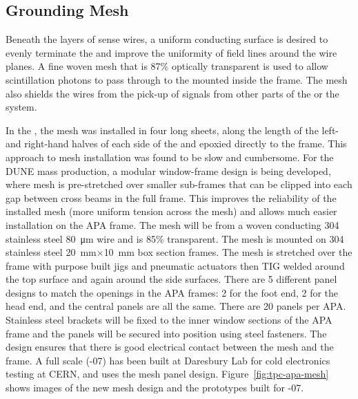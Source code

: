 
\subsection{Grounding Mesh}
\label{sec:fdsp-apa-mesh}

Beneath the layers of sense wires, a uniform conducting surface is desired to evenly terminate the \efield and improve the uniformity of field lines around the wire planes. A fine woven mesh that is \num{87}\% optically transparent is used to allow scintillation photons to pass through to the  mounted inside the frame.  The mesh also shields the  wires from the pick-up of signals from other parts of the  or the  system.  

In the  , the mesh was installed in four long sheets, along the length of the left- and right-hand halves of each side of the  and epoxied directly to the frame. This approach to mesh installation was found to be slow and cumbersome.  For the DUNE mass production, a modular window-frame design is being developed, where mesh is pre-stretched over smaller sub-frames that can be clipped into each gap between cross beams in the full  frame.   This improves the reliability of the installed mesh (more uniform tension across the mesh) and allows much easier installation on the APA frame. The mesh will be from a woven conducting 304 stainless steel \SI{80}{\um} wire and is 85\% transparent. The mesh is mounted on 304 stainless steel \SI{20}{mm}$\times$\SI{10}{mm} box section frames. The mesh is stretched over the frame with purpose built jigs and pneumatic actuators then TIG welded around the top surface and again around the side surfaces. There are 5 different panel designs to match the openings in the APA frames: 2 for the foot end, 2 for the head end, and the central panels are all the same. There are 20 panels per APA. Stainless steel brackets will be fixed to the inner window sections of the APA frame and the panels will be secured into position using steel fasteners. The design ensures that there is good electrical contact between the mesh and the frame. A full scale  (-07) has been built at Daresbury Lab for cold electronics testing at CERN, and uses the mesh panel design. Figure~\ref{fig:tpc-apa-mesh} shows images of the new mesh design and the prototypes built for -07.

